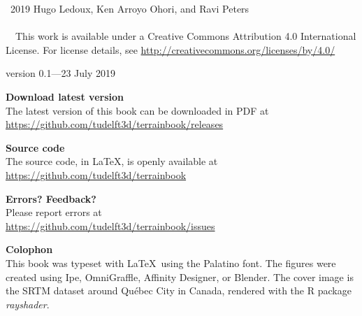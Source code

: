 
\clearpage
\thispagestyle{empty}
\null%
\vfill


\textcopyright\ 2019 Hugo Ledoux, Ken Arroyo Ohori, and Ravi Peters
\\ \\
\ccLogo\ \ccAttribution\ This work is available under a Creative Commons Attribution 4.0 International License.
For license details, see \url{http://creativecommons.org/licenses/by/4.0/}


version 0.1---23 July 2019


\textbf{Download latest version} \\
The latest version of this book can be downloaded in PDF at\\ 
\url{https://github.com/tudelft3d/terrainbook/releases}


\textbf{Source code} \\
The source code, in \LaTeX, is openly available at\\
\url{https://github.com/tudelft3d/terrainbook}


\textbf{Errors? Feedback?} \\
Please report errors at\\
\url{https://github.com/tudelft3d/terrainbook/issues}

\textbf{Colophon} \\
This book was typeset with \LaTeX\ using the Palatino font.
The figures were created using Ipe, OmniGraffle, Affinity Designer, or Blender.
The cover image is the SRTM dataset around Québec City in Canada, rendered with the R package \emph{rayshader}.

